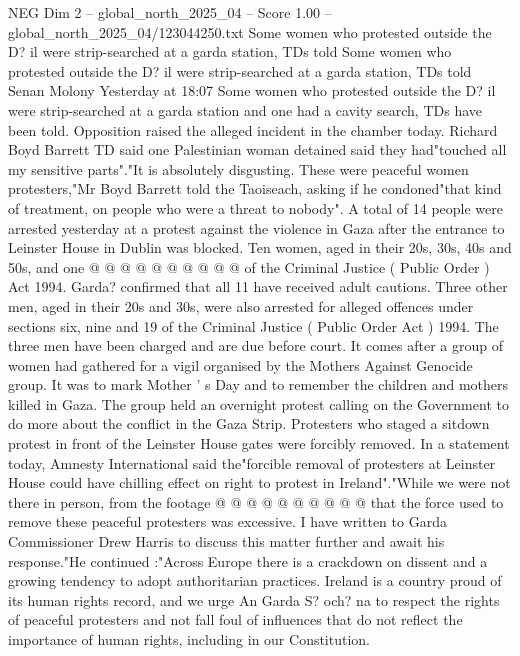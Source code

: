 \begin{textsample}{NEG Dim 2 – global\_north\_2025\_04 – Score 1.00 – global\_north\_2025\_04/123044250.txt}  \label{ex:f2_neg_123}
Some women who protested outside the D? il were strip-searched at a garda station, TDs told Some women who protested outside the D? il were strip-searched at a garda station, TDs told Senan Molony Yesterday at 18:07 Some women who protested outside the D? il were strip-searched at a garda station and one had a cavity search, TDs have been told.
Opposition raised the alleged incident in the chamber today.
Richard Boyd Barrett TD said one Palestinian woman detained said they had"touched all my sensitive parts"."It is absolutely disgusting.
These were peaceful women protesters,"Mr Boyd Barrett told the Taoiseach, asking if he condoned"that kind of treatment, on people who were a threat to nobody".
A total of 14 people were arrested yesterday at a protest against the violence in Gaza after the entrance to Leinster House in Dublin was blocked.
Ten women, aged in their 20s, 30s, 40s and 50s, and one @ @ @ @ @ @ @ @ @ @ of the Criminal Justice ( Public Order ) Act 1994.
Garda? confirmed that all 11 have received adult cautions.
Three other men, aged in their 20s and 30s, were also arrested for alleged offences under sections six, nine and 19 of the Criminal Justice ( Public Order Act ) 1994.
The three men have been charged and are due before court.
It comes after a group of women had gathered for a vigil organised by the Mothers Against Genocide group.
It was to mark Mother ' s Day and to remember the children and mothers killed in Gaza.
The group held an overnight protest calling on the Government to do more about the conflict in the Gaza Strip.
Protesters who staged a sitdown protest in front of the Leinster House gates were forcibly removed.
In a statement today, Amnesty International said the"forcible removal of protesters at Leinster House could have chilling effect on right to protest in Ireland"."While we were not there in person, from the footage @ @ @ @ @ @ @ @ @ @ that the force used to remove these peaceful protesters was excessive.
I have written to Garda Commissioner Drew Harris to discuss this matter further and await his response."He continued :"Across Europe there is a crackdown on dissent and a growing tendency to adopt authoritarian practices.
Ireland is a country proud of its human rights record, and we urge An Garda S? och? na to respect the rights of peaceful protesters and not fall foul of influences that do not reflect the importance of human rights, including in our Constitution.

\end{textsample}
